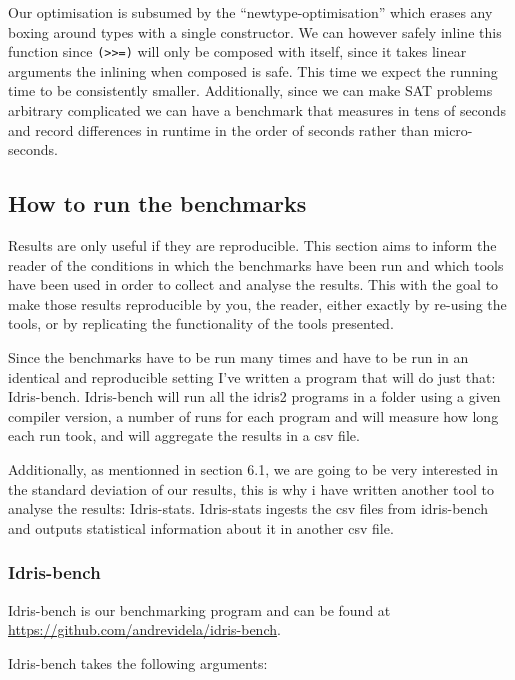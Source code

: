\documentclass[
]{article}
\begin{document}
Our optimisation is subsumed by the ``newtype-optimisation'' which
erases any boxing around types with a single constructor. We can however
safely inline this function since
\texttt{(\textgreater{}\textgreater{}=)} will only be composed with
itself, since it takes linear arguments the inlining when composed is
safe. This time we expect the running time to be consistently smaller.
Additionally, since we can make SAT problems arbitrary complicated we
can have a benchmark that measures in tens of seconds and record
differences in runtime in the order of seconds rather than
micro-seconds.

\hypertarget{how-to-run-the-benchmarks}{%
\subsection{How to run the benchmarks}\label{how-to-run-the-benchmarks}}

Results are only useful if they are reproducible. This section aims to
inform the reader of the conditions in which the benchmarks have been
run and which tools have been used in order to collect and analyse the
results. This with the goal to make those results reproducible by you,
the reader, either exactly by re-using the tools, or by replicating the
functionality of the tools presented.

Since the benchmarks have to be run many times and have to be run in an
identical and reproducible setting I've written a program that will do
just that: Idris-bench. Idris-bench will run all the idris2 programs in
a folder using a given compiler version, a number of runs for each
program and will measure how long each run took, and will aggregate the
results in a csv file.

Additionally, as mentionned in section 6.1, we are going to be very
interested in the standard deviation of our results, this is why i have
written another tool to analyse the results: Idris-stats. Idris-stats
ingests the csv files from idris-bench and outputs statistical
information about it in another csv file.

\hypertarget{idris-bench}{%
\subsubsection{Idris-bench}\label{idris-bench}}

Idris-bench is our benchmarking program and can be found at
\url{https://github.com/andrevidela/idris-bench}.

Idris-bench takes the following arguments:
\end{document}
